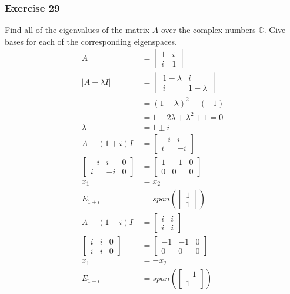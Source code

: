 \documentclass{math}
\begin{document}
\subsubsection*{Exercise 29}
Find all of the eigenvalues of the matrix \( A \) over the complex numbers
\( \mathbb{C} \). Give bases for each of the corresponding eigenspaces.
\begin{align*}
  A &= \begin{bmatrix}1 & i \\ i & 1\end{bmatrix} \\
  |A-\lambda I| &= \begin{vmatrix}
    1-\lambda & i \\
    i & 1-\lambda
  \end{vmatrix} \\
  &= (1-\lambda)^2-(-1) \\
  &= 1-2\lambda+\lambda^2+1 = 0 \\
  \lambda &= 1\pm i \\
  A-(1+i)I &= \begin{bmatrix}-i & i \\ i & -i\end{bmatrix} \\
  \left[\begin{array}{cc|c}
    -i & i & 0 \\
    i & -i & 0
  \end{array}\right] &= \begin{bmatrix}
    1 & -1 & 0 \\
    0 & 0 & 0
  \end{bmatrix} \\
  x_1 &= x_2 \\
  E_{1+i} &= span\left(\begin{bmatrix}1 \\ 1\end{bmatrix}\right) \\
  A-(1-i)I &= \begin{bmatrix}i & i \\ i & i\end{bmatrix} \\
  \left[\begin{array}{cc|c}
    i & i & 0 \\
    i & i & 0
  \end{array}\right] &= \begin{bmatrix}
    -1 & -1 & 0 \\
    0 & 0 & 0
  \end{bmatrix} \\
  x_1 &= -x_2 \\
  E_{1-i} &= span\left(\begin{bmatrix}-1 \\ 1\end{bmatrix}\right)
\end{align*}
\end{document}

